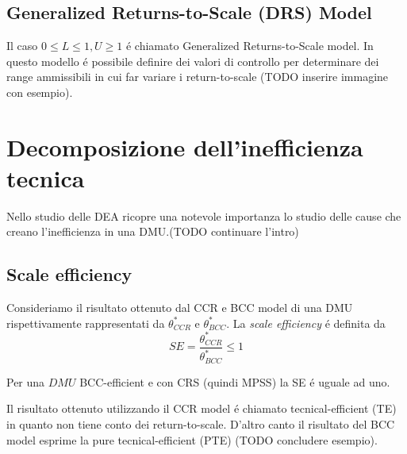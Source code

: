 \subsection{Generalized Returns-to-Scale (DRS) Model}
\bigskip
Il caso $0 \leq L \leq 1, U \geq 1$ \'e chiamato Generalized Returns-to-Scale model. In questo modello \'e possibile definire dei valori di controllo per determinare dei range ammissibili in cui far variare i return-to-scale (TODO inserire immagine con esempio).
\section{Decomposizione dell'inefficienza tecnica}
\bigskip

Nello studio delle DEA ricopre una notevole importanza lo studio delle cause che creano l'inefficienza in una DMU.(TODO continuare l'intro)

\subsection{Scale efficiency}

\begin{definiz} \label{EQ:scale efficiency}
Consideriamo il risultato ottenuto dal CCR e BCC model di una DMU rispettivamente rappresentati da $\theta^*_{CCR}$ e $\theta^*_{BCC}$. La \emph{scale efficiency} \'e definita da
\begin{equation}
SE = \frac{\theta^*_{CCR}}{\theta^*_{BCC}} \leq 1
\end{equation}
\end{definiz}
\begin{oss} Per una $DMU$ BCC-efficient e con CRS (quindi MPSS) la SE \'e uguale ad uno. 
\end{oss}
\begin{oss} Il risultato ottenuto utilizzando il CCR model \'e chiamato tecnical-efficient (TE) in quanto non tiene conto dei return-to-scale. D'altro canto il risultato del BCC model esprime la pure tecnical-efficient (PTE) (TODO concludere esempio).
\end{oss}

